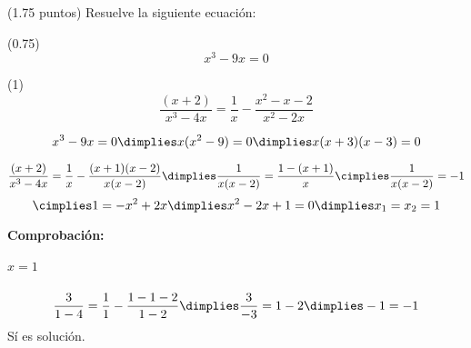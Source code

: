 
\begin{problem}(1.75 puntos)
Resuelve la siguiente ecuación:

\ppart (0.75) \[x^3-9x = 0\]

\ppart (1) \[
	\frac{(x+2)}{x^3-4x} = \frac{1}{x} - \frac{x^2-x-2}{x^2-2x}
\]
\solution

\spart
\[
	x^3-9x = 0 \dimplies x(x^2-9) = 0 \dimplies x(x+3)(x-3) = 0
\]

\spart 
\[
	\frac{(x+2)}{x^3-4x} = \frac{1}{x} - \frac{(x+1)(x-2)}{x(x-2)} \dimplies
	 \frac{1}{x(x-2)} = \frac{1-(x+1)}{x} \cimplies \frac{1}{x(x-2)} = -1
\]
\[
	\cimplies 1=-x^2+2x \dimplies x^2-2x+1 = 0 \dimplies x_1=x_2=1
\]

\textbf{Comprobación:}

\subparagraph{$x=1$}
\[
\frac{3}{1-4} = \frac{1}{1} - \frac{1-1-2}{1-2} \dimplies \frac{3}{-3} = 1-2 \dimplies -1=-1
\]
Sí es solución.
\end{problem}
